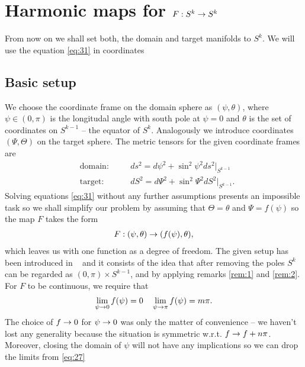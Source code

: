 \section{Harmonic maps for $F:S^k\rightarrow S^k$}
\label{sec:harmonic-maps-skra}

From now on we shall set both, the domain and target manifolds to
$S^k$. We will use the equation \eqref{eq:31} in coordinates

\subsection{Basic setup}
\label{sec:basic-setup}

We choose the coordinate frame on the domain sphere as
$(\psi,\theta)$, where $\psi\in(0,\pi)$ is the longitudal angle with
south pole at $\psi=0$ and $\theta$ is the set of coordinates on
$S^{k-1}$ -- the equator of $S^k$. Analogously we introduce
coordinates $(\Psi,\Theta)$ on the target sphere. The metric tensors
for the given coordinate frames are
\begin{align}
  \label{eq:23}
  &\text{domain:}&\quad &ds^2=d\psi^2+\sin^2\psi^2ds^2\big|_{S^{k-1}}\\
  &\text{target:}&\quad &dS^2=d\Psi^2+\sin^2\Psi^2dS^2\big|_{S^{k-1}}.
\end{align}
Solving equations \eqref{eq:31} without any further assumptions
presents an impossible task so we shall simplify our problem by
assuming that $\Theta=\theta$ and $\Psi=f(\psi)$ so the map $F$ takes
the form
\begin{align}
  \label{eq:24}
  F:(\psi,\theta)\rightarrow(f(\psi),\theta),
\end{align}
which leaves us with one function as a degree of freedom. The given
setup has been introduced in ~\cite{Eells1964} and it consists of the
idea that after removing the poles $S^k$ can be regarded as
$(0,\pi)\times S^{k-1}$, and by applying remarks \ref{rem:1} and
\ref{rem:2}.\\

For $F$ to be continuous, we require that
\begin{align}
  \label{eq:27}
  \lim_{\psi\rightarrow0}f(\psi)=0\quad\lim_{\psi\rightarrow\pi}f(\psi)=m\pi.
\end{align}
The choice of $f\rightarrow0$ for $\psi\rightarrow0$ was only the matter of
convenience -- we haven't lost any generality because the situation is
symmetric
w.r.t. $f\rightarrow f+n\pi$. Moreover, closing the domain of $\psi$ will not
have any implications so we can drop the limits from \eqref{eq:27} \\

